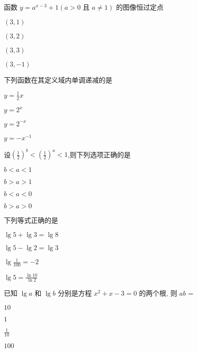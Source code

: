 \documentclass{exam-zh}
\begin{document}
    
    \begin{question}
      函数 $y =  a^{x-3} +1 (a>0 \text{~且~}  a \neq 1 )$ 的图像恒过定点\paren[B]
      \begin{choices}
      \item $(3,1)$
      \item $(3,2)$
      \item $(3,3)$
      \item $(3,-1)$
      \end{choices}
    \end{question}


    \begin{question}
      下列函数在其定义域内单调递减的是\paren[C]
      \begin{choices}
      \item $y =\frac{1}{2} x $
      \item $y = 2^x$
      \item $y = 2^{-x}$
      \item $y = -x^{-1}$
      \end{choices}
    \end{question}


    
    \begin{question}
      设$(\frac{1}{2})^b < (\frac{1}{2})^a < 1 $,则下列选项正确的是\paren[D]
      \begin{choices}
      \item $b<a<1 $
      \item $b>a>1 $
      \item $b<a<0 $
      \item $b>a>0 $
      \end{choices}
    \end{question}





\begin{question}
  下列等式正确的是\paren[C]
  \begin{choices}
  \item $\lg 5 + \lg 3 = \lg 8$
  \item $\lg 5 - \lg 2 = \lg 3$
  \item $\lg \frac{1}{100}  = - 2$
  \item $\lg 5 = \frac{\ln 10}{\ln 2}$
  \end{choices}
\end{question}


\begin{question}
  已知 $\lg a $ 和 $\lg b$ 分别是方程 $x^2+x-3  = 0$ 的两个根, 则 $ab$ = \paren[C]
  \begin{choices}
  \item $10$
  \item $1$
  \item $\frac{1}{10}$
  \item $100$
  \end{choices}
\end{question}
\end{document}
